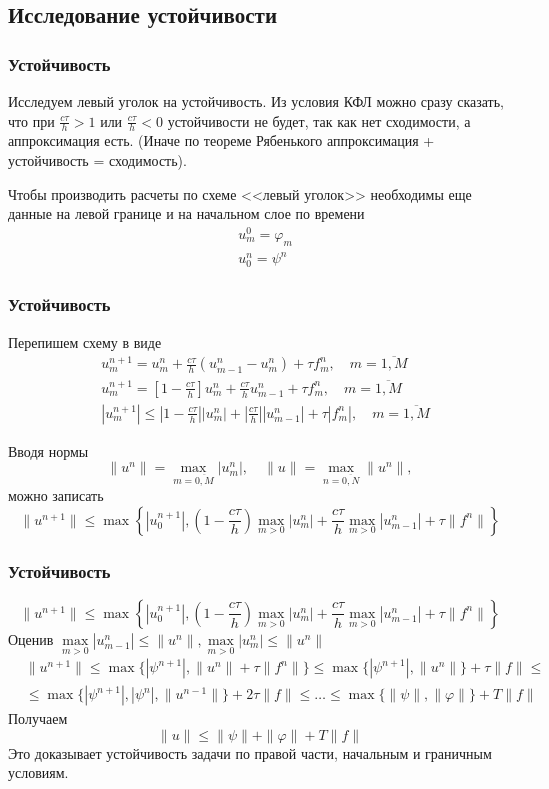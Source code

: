 \documentclass[professionalfonts,compress,unicode,aspectratio=169]{beamer}
\begin{document}
\subsection{Исследование устойчивости}
\begin{frame}\frametitle{Устойчивость}
	Исследуем левый уголок на устойчивость. Из условия КФЛ можно сразу сказать, что при $\frac{c\tau}{h} > 1$ или $\frac{c\tau}{h} < 0$ устойчивости не будет,
	так как нет сходимости, а аппроксимация есть. (Иначе по теореме Рябенького аппроксимация + устойчивость = сходимость).

	Чтобы производить расчеты по схеме <<левый уголок>> необходимы еще данные на левой границе и на начальном слое по времени
	\begin{align*}
	&u^0_m = \varphi_m\\
	&u^n_0 = \psi^n
	\end{align*}
\end{frame}

\begin{frame}\frametitle{Устойчивость}
	Перепишем схему в виде
	\begin{align*}
	&u^{n+1}_m = u^n_m + \frac{c\tau}{h}\left(u^n_{m-1}-u^n_m\right)+\tau f_m^n, \quad m=\overline{1,M}\\
	&u^{n+1}_m = \left[1-\frac{c\tau}{h}\right] u^n_m + \frac{c\tau}{h}u^n_{m-1}+\tau f_m^n, \quad m=\overline{1,M}\\
	&|u^{n+1}_m| \leqslant \left|1-\frac{c\tau}{h}\right||u^n_m| + \left|\frac{c\tau}{h}\right||u^n_{m-1}|+\tau |f_m^n|, \quad m=\overline{1,M}
	\end{align*}

	Вводя нормы
	\[
	\|u^n\| = \max_{m=\overline{0,M}} |u^n_m|, \quad
	\|u\| = \max_{n=\overline{0,N}} \|u^n\|,
	\]
	можно записать
	\[
	\|u^{n+1}\| \leqslant \max\left\{|u_0^{n+1}|,
	\left(1-\frac{c\tau}{h}\right)\max_{m>0}|u^n_m|+
	\frac{c\tau}{h}\max_{m>0}|u^n_{m-1}|+ \tau \|f^n\|
	\right\}
	\]
\end{frame}

\begin{frame}\frametitle{Устойчивость}
	\[
	\|u^{n+1}\| \leqslant \max\left\{|u_0^{n+1}|,
	\left(1-\frac{c\tau}{h}\right)\max_{m>0}|u^n_m|+
	\frac{c\tau}{h}\max_{m>0}|u^n_{m-1}|+ \tau \|f^n\| \right\}
	\]
	Оценив $\max\limits_{m>0}|u^n_{m-1}| \leqslant \|u^n\|, \max\limits_{m>0}|u^n_{m}| \leqslant \|u^n\|$
	\begin{align*}
	&\|u^{n+1}\| \leqslant \max \{|\psi^{n+1}|, \|u^n\|+\tau \|f^n\|\} \leqslant \max \{|\psi^{n+1}|, \|u^n\|\}+\tau \|f\|\leqslant\\
	&\leqslant \max \{|\psi^{n+1}|, |\psi^n|, \|u^{n-1}\|\}+2\tau \|f\| \leqslant \dots \leqslant \max \{\|\psi\|, \|\varphi\|\}+T \|f\|
	\end{align*}
	Получаем
	\[
	\|u\| \leqslant \|\psi\|+\|\varphi\|+T\|f\|
	\]
	Это доказывает устойчивость задачи по правой части, начальным и граничным условиям.
\end{frame}
\end{document}
